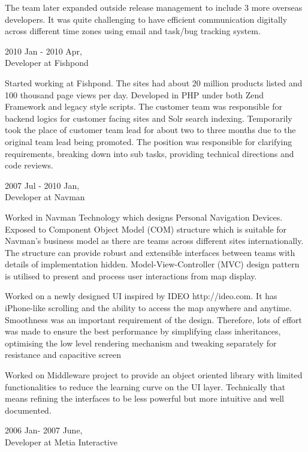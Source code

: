 \begin{resume}
The team later expanded outside release management to include 3 more overseas developers. It was quite challenging to have efficient communication digitally across different time zones using email and task/bug tracking system.

\hspace*{-0.25in} 2010 Jan - 2010 Apr,\\
\hspace*{-0.25in} Developer at Fishpond

Started working at Fishpond. The sites had about 20 million products listed and 100 thousand page views per day. Developed in PHP under both Zend Framework and legacy style scripts. The customer team was responsible for backend logics for customer facing sites and Solr search indexing. Temporarily took the place of customer team lead for about two to three months due to the original team lead being promoted. The position was responsible for clarifying requirements, breaking down into sub tasks, providing technical directions and code reviews.

\hspace*{-0.25in} 2007 Jul - 2010 Jan,\\
\hspace*{-0.25in} Developer at Navman

Worked in Navman Technology which designs Personal Navigation Devices. Exposed to Component Object Model (COM) structure which is suitable for Navman's business model as there are teams across different sites internationally. The structure can provide robust and extensible interfaces between teams with details of implementation hidden. Model-View-Controller (MVC) design pattern is utilised to present and process user interactions from map display.

Worked on a newly designed UI inspired by IDEO http://ideo.com. It has iPhone-like scrolling and the ability to access the map anywhere and anytime. Smoothness was an important requirement of the design. Therefore, lots of effort was made to ensure the best performance by simplifying class inheritances, optimising the low level rendering mechanism and tweaking separately for resistance and capacitive screen

Worked on Middleware project to provide an object oriented library with limited functionalities to reduce the learning curve on the UI layer. Technically that means refining the interfaces to be less powerful but more intuitive and well documented.

\hspace*{-0.25in} 2006 Jan- 2007 June,\\
\hspace*{-0.25in} Developer at Metia Interactive


\end{resume}
